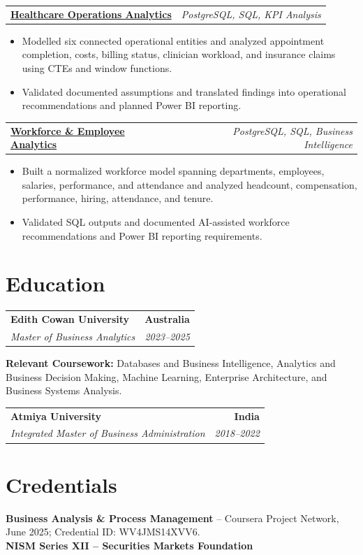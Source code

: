 \documentclass[letterpaper,10pt]{article}
\makeatletter
\newcommand{\role}[4]{%
  \begin{tabularx}{\textwidth}{@{}Xr@{}}
    \textbf{#1} & \textbf{#2} \\
    \textit{#3} & \textit{#4}
  \end{tabularx}\vspace{-1pt}
}
\newcommand{\project}[2]{%
  \begin{tabularx}{\textwidth}{@{}Xr@{}}
    \textbf{#1} & \textit{#2}
  \end{tabularx}\vspace{-1pt}
}
\makeatother
\begin{document}
\project{\href{https://github.com/jainalimehta/Healthcare-Analytics}{Healthcare Operations Analytics}}{PostgreSQL, SQL, KPI Analysis}
\begin{itemize}
  \item Modelled six connected operational entities and analyzed appointment completion, costs, billing status, clinician workload, and insurance claims using CTEs and window functions.
  \item Validated documented assumptions and translated findings into operational recommendations and planned Power BI reporting.
\end{itemize}
\vspace{1pt}

\project{\href{https://github.com/jainalimehta/HR-Analytics}{Workforce \& Employee Analytics}}{PostgreSQL, SQL, Business Intelligence}
\begin{itemize}
  \item Built a normalized workforce model spanning departments, employees, salaries, performance, and attendance and analyzed headcount, compensation, performance, hiring, attendance, and tenure.
  \item Validated SQL outputs and documented AI-assisted workforce recommendations and Power BI reporting requirements.
\end{itemize}

\section{Education}
\role{Edith Cowan University}{Australia}{Master of Business Analytics}{2023--2025}
\small\textbf{Relevant Coursework:} Databases and Business Intelligence, Analytics and Business Decision Making, Machine Learning, Enterprise Architecture, and Business Systems Analysis.\\[2pt]
\role{Atmiya University}{India}{Integrated Master of Business Administration}{2018--2022}

\section{Credentials}
\small\textbf{Business Analysis \& Process Management} -- Coursera Project Network, June 2025; Credential ID: WV4JMS14XVV6.\\[-0.2pt]
\small\textbf{NISM Series XII -- Securities Markets Foundation}
\end{document}
